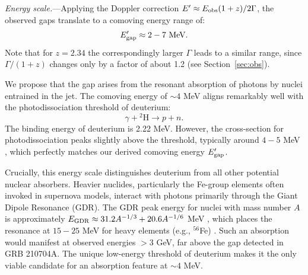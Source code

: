\documentclass[linenumbers,twocolumn]{aastex631}
\begin{document}
\textit{Energy scale.}---Applying the Doppler correction $E' \approx E_{\rm obs} (1+z) / 2\Gamma$, the observed gaps translate to a comoving energy range of:
\begin{equation}
E_{\rm gap}^{\prime} \approx 2 - 7 \text{ MeV}.
\end{equation}
Note that for $z=2.34$ the correspondingly larger $\Gamma$ leads to a similar range, since $\Gamma/(1+z)$ changes only by a factor of about 1.2 (see Section~\ref{sec:obs}).

We propose that the gap arises from the resonant absorption of photons by nuclei entrained in the jet. The comoving energy of $\sim 4$ MeV aligns remarkably well with the photodissociation threshold of deuterium:
\begin{equation}
\gamma + {^2\text{H}} \rightarrow p + n.
\end{equation}
The binding energy of deuterium is 2.22 MeV. However, the cross-section for photodissociation peaks slightly above the threshold, typically around $4-5$ MeV \citep{IAEA2000}, which perfectly matches our derived comoving energy $E_{\rm gap}^{\prime}$.

Crucially, this energy scale distinguishes deuterium from all other potential nuclear absorbers. Heavier nuclides, particularly the Fe-group elements often invoked in supernova models, interact with photons primarily through the Giant Dipole Resonance (GDR). The GDR peak energy for nuclei with mass number $A$ is approximately $E_{\rm GDR} \approx 31.2 A^{-1/3} + 20.6 A^{-1/6}$ MeV \citep{1975RvMP...47..713B}, which places the resonance at $15-25$ MeV for heavy elements (e.g., $^{56}$Fe) \citep{2020NuDS..163..109K}. Such an absorption would manifest at observed energies $>3$ GeV, far above the gap detected in GRB 210704A. The unique low-energy threshold of deuterium makes it the only viable candidate for an absorption feature at $\sim 4$ MeV.
\end{document}
